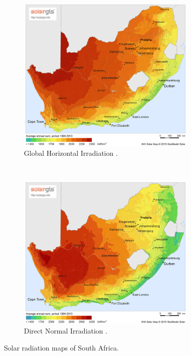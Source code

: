 \documentclass[Master,MEE,english]{twbook}%
\begin{document}
\begin{figure}[h!]
        \centering
        \begin{subfigure}[b]{0.5\textwidth}
                \centering
                \includegraphics[width=0.95\textwidth]{FIG/SA_GHI}
                \caption{Global Horizontal Irradiation \cite{SolarGIS2015a}.}\label{fig:bild-links}
        \end{subfigure}%
        ~
        \begin{subfigure}[b]{0.5\textwidth}
                \centering
                \includegraphics[width=0.95\textwidth]{FIG/SA_DNI}
                \caption{Direct Normal Irradiation \cite{SolarGIS2015b}.}\label{fig:bild-rechts}
        \end{subfigure}
        \caption{Solar radiation maps of South Africa.}\label{irradiation}
\end{figure}
\pagebreak
\end{document}
